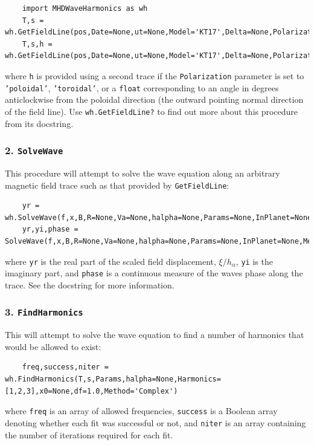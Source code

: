 	\begin{verbatim}
	import MHDWaveHarmonics as wh
	T,s = wh.GetFieldLine(pos,Date=None,ut=None,Model='KT17',Delta=None,Polarization='none',**kwargs)
	T,s,h = wh.GetFieldLine(pos,Date=None,ut=None,Model='KT17',Delta=None,Polarization='poloidal',**kwargs)
	\end{verbatim}
	
	where \texttt{h} is provided using a second trace if the \texttt{Polarization} parameter
	is set to \texttt{'poloidal'}, \texttt{'toroidal'}, or a \texttt{float} corresponding to an
	angle in degrees anticlockwise from the poloidal direction (the outward
	pointing normal direction of the field line). Use \texttt{wh.GetFieldLine?}
	to find out more about this procedure from its docstring.
	
	\subsubsection{2. \texttt{SolveWave}}
	
	This procedure will attempt to solve the wave equation along an arbitrary
	magnetic field trace such as that provided by \texttt{GetFieldLine}:
	
	\begin{verbatim}
	yr = wh.SolveWave(f,x,B,R=None,Va=None,halpha=None,Params=None,InPlanet=None,Method='Simple',Unscale=True)
	yr,yi,phase = SolveWave(f,x,B,R=None,Va=None,halpha=None,Params=None,InPlanet=None,Method='Complex',Unscale=True)
	\end{verbatim}
	
	where \texttt{yr} is the real part of the scaled field displacement, $\xi/h_\alpha$, \texttt{yi} 
	is the imaginary part, and \texttt{phase} is a continuous measure of the waves
	phase along the trace. See the docstring for more information.
	
	\subsubsection{3. \texttt{FindHarmonics}}
	
	This will attempt to solve the wave equation to find a number
	of harmonics that would be allowed to exist:
	
	\begin{verbatim}
	freq,success,niter = wh.FindHarmonics(T,s,Params,halpha=None,Harmonics=[1,2,3],x0=None,df=1.0,Method='Complex')
	\end{verbatim}
	
	where \texttt{freq} is an array of allowed frequencies, \texttt{success} is a Boolean 
	array denoting whether each fit was successful or not, and \texttt{niter} is an 
	array containing the number of iterations required for each fit.
	
